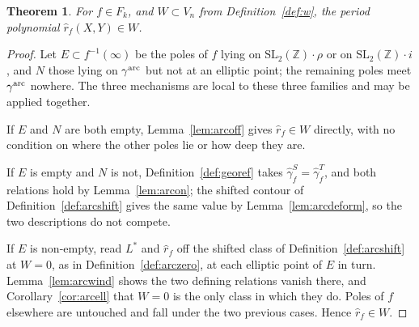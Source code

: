 \documentclass[11pt]{article}
\newtheorem{theorem}{Theorem}[section]
\newcommand{\ZZ}{\mathbb{Z}}
\newcommand{\SLZ}{\mathrm{SL}_2(\ZZ)}
\begin{document}

\begin{theorem}\label{thm:arcperiod}
For $f\in F_k$, and $W\subset V_n$ from Definition~\ref{def:w}, the period polynomial
$\hat r_f(X,Y)\in W$.
\end{theorem}

\begin{proof}
Let $E\subset f^{-1}(\infty)$ be the poles of $f$ lying on $\SLZ\!\cdot\!\rho$ or on
$\SLZ\!\cdot\!i$, and $N$ those lying on $\gamma^{\rm arc}$ but not at an elliptic point; the
remaining poles meet $\gamma^{\rm arc}$ nowhere. The three mechanisms are local to these three
families and may be applied together.

If $E$ and $N$ are both empty, Lemma~\ref{lem:arcoff} gives $\hat r_f\in W$ directly, with no
condition on where the other poles lie or how deep they are.

If $E$ is empty and $N$ is not, Definition~\ref{def:georef} takes $\hat\gamma^S_f=\hat\gamma^T_f$,
and both relations hold by Lemma~\ref{lem:arcon}; the shifted contour of
Definition~\ref{def:arcshift} gives the same value by Lemma~\ref{lem:arcdeform}, so the two
descriptions do not compete.

If $E$ is non-empty, read $L^*$ and $\hat r_f$ off the shifted class of
Definition~\ref{def:arcshift} at $W=0$, as in Definition~\ref{def:arczero}, at each elliptic
point of $E$ in turn. Lemma~\ref{lem:arcwind} shows the two defining relations vanish there, and
Corollary~\ref{cor:arcell} that $W=0$ is the only class in which they do. Poles of $f$ elsewhere
are untouched and fall under the two previous cases. Hence $\hat r_f\in W$.
\end{proof}
\end{document}
